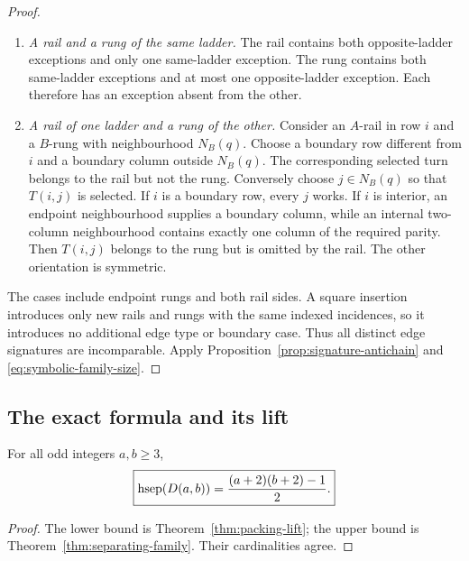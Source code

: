 \begin{proof}
\begin{enumerate}[label=\arabic*.,leftmargin=*]
\item \emph{A rail and a rung of the same ladder.}  The rail contains both
opposite-ladder exceptions and only one same-ladder exception.  The rung
contains both same-ladder exceptions and at most one opposite-ladder
exception.  Each therefore has an exception absent from the other.

\item \emph{A rail of one ladder and a rung of the other.}  Consider an
\(A\)-rail in row \(i\) and a \(B\)-rung with neighbourhood \(N_B(q)\).
Choose a boundary row different from \(i\) and a boundary column outside
\(N_B(q)\).  The corresponding selected turn belongs to the rail but not the
rung.  Conversely choose \(j\in N_B(q)\) so that \(T(i,j)\) is selected.
If \(i\) is a boundary row, every \(j\) works.  If \(i\) is interior, an
endpoint neighbourhood supplies a boundary column, while an internal
two-column neighbourhood contains exactly one column of the required parity.
Then \(T(i,j)\) belongs to the rung but is omitted by the rail.  The other
orientation is symmetric.
\end{enumerate}

The cases include endpoint rungs and both rail sides.  A square insertion
introduces only new rails and rungs with the same indexed incidences, so it
introduces no additional edge type or boundary case.  Thus all distinct edge
signatures are incomparable.  Apply
Proposition~\ref{prop:signature-antichain} and
\cref{eq:symbolic-family-size}.
\end{proof}

\subsection{The exact formula and its lift}

\begin{theorem}
\label{thm:exact-double-ladder}
For all odd integers \(a,b\ge3\),
\begin{equation}
\label{eq:exact-double-ladder}
 \boxed{\displaystyle
 \operatorname{hsep}(D(a,b))=\frac{(a+2)(b+2)-1}{2}.}
\end{equation}
\end{theorem}

\begin{proof}
The lower bound is Theorem~\ref{thm:packing-lift}; the upper bound is
Theorem~\ref{thm:separating-family}.  Their cardinalities agree.
\end{proof}

